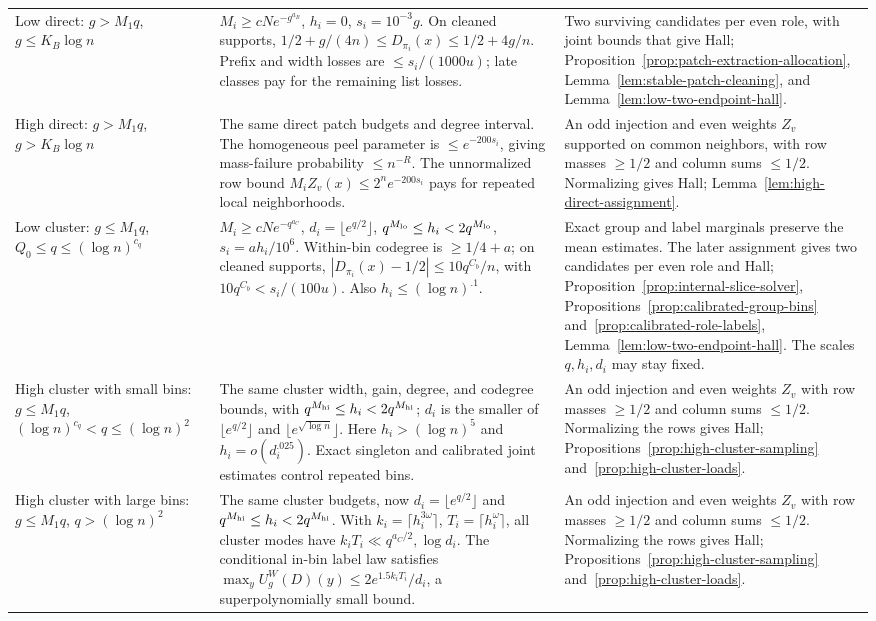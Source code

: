 \begin{longtable}{@{}>{\raggedright\arraybackslash}p{.255\linewidth}>{\raggedright\arraybackslash}p{.355\linewidth}>{\raggedright\arraybackslash}p{.345\linewidth}@{}}
Low direct: $g>M_1q$, $g\le K_B\log n$ &
$M_i\ge cNe^{-g^{a_B}}$, $h_i=0$, $s_i=10^{-3}g$.
On cleaned supports,
$1/2+g/(4n)\le D_{\pi_i}(x)\le1/2+4g/n$.
Prefix and width losses are $\le s_i/(1000u)$; late classes pay for
the remaining list losses. &
Two surviving candidates per even role, with joint bounds that give Hall;
Proposition~\ref{prop:patch-extraction-allocation},
Lemma~\ref{lem:stable-patch-cleaning}, and
Lemma~\ref{lem:low-two-endpoint-hall}.\\

High direct: $g>M_1q$, $g>K_B\log n$ &
The same direct patch budgets and degree interval.
The homogeneous peel parameter is $\le e^{-200s_i}$, giving mass-failure
probability $\le n^{-R}$. The unnormalized row bound
$M_iZ_v(x)\le2^n e^{-200s_i}$ pays for repeated local neighborhoods. &
An odd injection and even weights $Z_v$ supported on common neighbors,
with row masses $\ge1/2$ and column sums $\le1/2$. Normalizing gives Hall;
Lemma~\ref{lem:high-direct-assignment}.\\

Low cluster: $g\le M_1q$, $Q_0\le q\le(\log n)^{c_q}$ &
$M_i\ge cNe^{-q^{a_C}}$, $d_i=\lfloor e^{q/2}\rfloor$,
$q^{M_{\rm lo}}\le h_i<2q^{M_{\rm lo}}$,
$s_i=ah_i/10^6$.
Within-bin codegree is $\ge1/4+a$; on cleaned supports,
$|D_{\pi_i}(x)-1/2|\le10q^{C_b}/n$, with
$10q^{C_b}<s_i/(100u)$. Also $h_i\le(\log n)^{.1}$. &
Exact group and label marginals preserve the mean estimates.
The later assignment gives two candidates per even role and Hall;
Proposition~\ref{prop:internal-slice-solver},
Propositions~\ref{prop:calibrated-group-bins}
and~\ref{prop:calibrated-role-labels},
Lemma~\ref{lem:low-two-endpoint-hall}.
The scales $q,h_i,d_i$ may stay fixed.\\

High cluster with small bins: $g\le M_1q$,
$(\log n)^{c_q}<q\le(\log n)^2$ &
The same cluster width, gain, degree, and codegree bounds, with
$q^{M_{\rm hi}}\le h_i<2q^{M_{\rm hi}}$; $d_i$ is the smaller of
$\lfloor e^{q/2}\rfloor$ and $\lfloor e^{\sqrt{\log n}}\rfloor$.
Here $h_i>(\log n)^5$ and $h_i=o(d_i^{.025})$.
Exact singleton and calibrated joint estimates control repeated bins. &
An odd injection and even weights $Z_v$ with row masses $\ge1/2$
and column sums $\le1/2$. Normalizing the rows gives Hall;
Propositions~\ref{prop:high-cluster-sampling}
and~\ref{prop:high-cluster-loads}.\\

High cluster with large bins: $g\le M_1q$, $q>(\log n)^2$ &
The same cluster budgets, now $d_i=\lfloor e^{q/2}\rfloor$ and
$q^{M_{\rm hi}}\le h_i<2q^{M_{\rm hi}}$.
With $k_i=\lceil h_i^{3\omega}\rceil$,
$T_i=\lceil h_i^\omega\rceil$, all cluster modes have
$k_iT_i\ll q^{a_C/2},\log d_i$.
The conditional in-bin label law satisfies
$\max_y U_g^W(D)(y)\le2e^{1.5k_iT_i}/d_i$, a superpolynomially
small bound. &
An odd injection and even weights $Z_v$ with row masses $\ge1/2$
and column sums $\le1/2$. Normalizing the rows gives Hall;
Propositions~\ref{prop:high-cluster-sampling}
and~\ref{prop:high-cluster-loads}.\\
\end{longtable}
